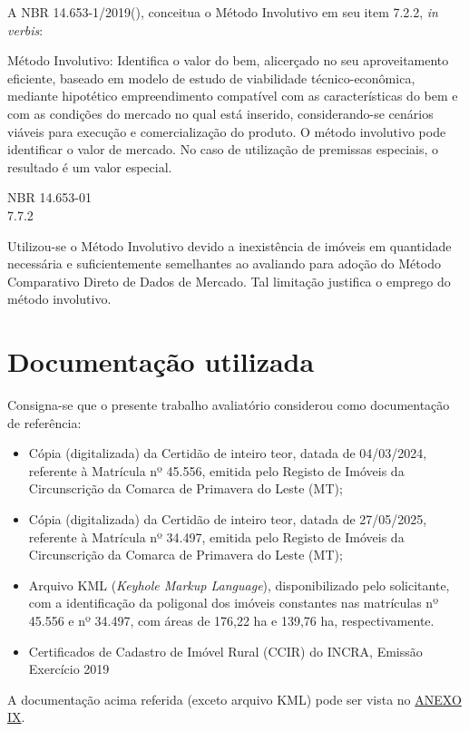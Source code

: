 \documentclass[
  10pt,
  a4paper]{article}
\providecommand{\tightlist}{%
  \setlength{\itemsep}{0pt}\setlength{\parskip}{0pt}}
\begin{document}
A NBR 14.653-1/2019(), conceitua o
Método Involutivo em seu item 7.2.2, \emph{in verbis}:

\epigraph{Método Involutivo: Identifica o valor do bem, alicerçado no seu 
aproveitamento eficiente, baseado em modelo de estudo de viabilidade 
técnico-econômica, mediante hipotético empreendimento compatível com as 
características do bem e com as condições do mercado no qual está inserido, 
considerando-se cenários viáveis para execução e comercialização do produto. O
método involutivo pode identificar o valor de mercado. No caso de utilização de
premissas especiais, o resultado é um valor especial.}{NBR 14.653-01 \\ 7.7.2}

Utilizou-se o Método Involutivo devido a inexistência de imóveis em
quantidade necessária e suficientemente semelhantes ao avaliando para
adoção do Método Comparativo Direto de Dados de Mercado. Tal limitação
justifica o emprego do método involutivo.

\section{Documentação utilizada}\label{documentauxe7uxe3o-utilizada}

Consigna-se que o presente trabalho avaliatório considerou como
documentação de referência:

\begin{itemize}
\tightlist
\item
  Cópia (digitalizada) da Certidão de inteiro teor, datada de
  04/03/2024, referente à Matrícula nº 45.556, emitida pelo Registo de
  Imóveis da Circunscrição da Comarca de Primavera do Leste (MT);
\item
  Cópia (digitalizada) da Certidão de inteiro teor, datada de
  27/05/2025, referente à Matrícula nº 34.497, emitida pelo Registo de
  Imóveis da Circunscrição da Comarca de Primavera do Leste (MT);
\item
  Arquivo KML (\emph{Keyhole Markup Language}), disponibilizado pelo
  solicitante, com a identificação da poligonal dos imóveis constantes
  nas matrículas nº 45.556 e nº 34.497, com áreas de 176,22 ha e 139,76
  ha, respectivamente.
\item
  Certificados de Cadastro de Imóvel Rural (CCIR) do INCRA, Emissão
  Exercício 2019
\end{itemize}

A documentação acima referida (exceto arquivo KML) pode ser vista no
\hyperref[anexo-ix]{ANEXO IX}.
\end{document}
